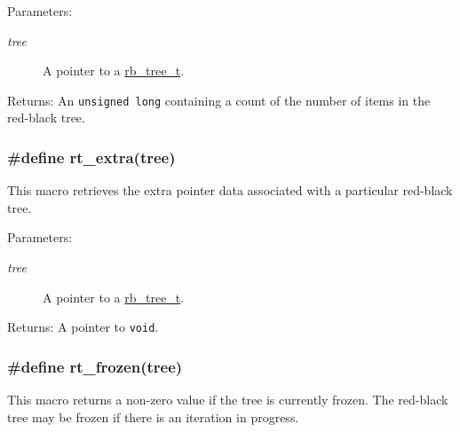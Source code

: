 \begin{Desc}
\item[Parameters:]
\begin{description}
\item[{\em tree}]A pointer to a \hyperlink{group__dbprim__rbtree_a0}{rb\_\-tree\_\-t}.\end{description}
\end{Desc}
\begin{Desc}
\item[Returns:]An {\tt unsigned long} containing a count of the number of items in the red-black tree. \end{Desc}
\hypertarget{group__dbprim__rbtree_a20}{
\subsubsection[rt\_\-extra]{\setlength{\rightskip}{0pt plus 5cm}\#define rt\_\-extra(tree)}}
\label{group__dbprim__rbtree_a20}


This macro retrieves the extra pointer data associated with a particular red-black tree.

\begin{Desc}
\item[Parameters:]
\begin{description}
\item[{\em tree}]A pointer to a \hyperlink{group__dbprim__rbtree_a0}{rb\_\-tree\_\-t}.\end{description}
\end{Desc}
\begin{Desc}
\item[Returns:]A pointer to {\tt void}. \end{Desc}
\hypertarget{group__dbprim__rbtree_a16}{
\subsubsection[rt\_\-frozen]{\setlength{\rightskip}{0pt plus 5cm}\#define rt\_\-frozen(tree)}}
\label{group__dbprim__rbtree_a16}


This macro returns a non-zero value if the tree is currently frozen. The red-black tree may be frozen if there is an iteration in progress.

